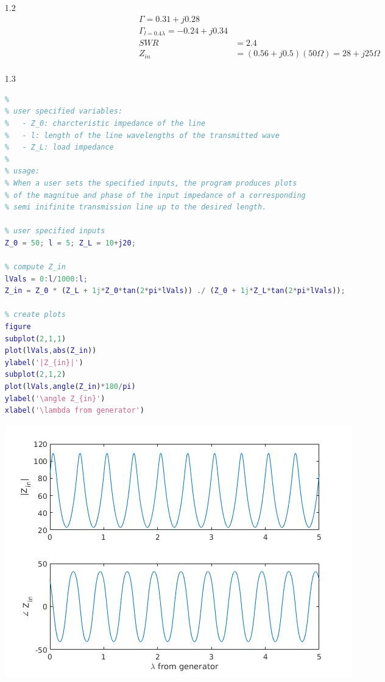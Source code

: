 \documentclass{article}
\begin{document}
\begin{enumerate}
\item[1.2]
\begin{align*}
\Gamma = 0.31 + j 0.28 \\
{\Gamma}_{l=0.4\lambda} = -0.24 + j 0.34 \\
SWR &= 2.4 \\
Z_{in} &= (0.56 + j0.5)(50\Omega) = 28 + j25 \Omega \\
\end{align*}

\item[1.3]
\ \\
\begin{lstlisting}[language=matlab]
%% ZinSITL: plot Z_in for a simi-infinite transmission line carrying a sinusoid
%
% user specified variables:
%   - Z_0: charcteristic impedance of the line
%   - l: length of the line wavelengths of the transmitted wave
%   - Z_L: load impedance
%
% usage:
% When a user sets the specified inputs, the program produces plots
% of the magnitue and phase of the input impedance of a corresponding
% semi inifinite transmission line up to the desired length.

% user specified inputs
Z_0 = 50; l = 5; Z_L = 10+j20;

% compute Z_in
lVals = 0:l/1000:l;
Z_in = Z_0 * (Z_L + 1j*Z_0*tan(2*pi*lVals)) ./ (Z_0 + 1j*Z_L*tan(2*pi*lVals));

% create plots
figure
subplot(2,1,1)
plot(lVals,abs(Z_in))
ylabel('|Z_{in}|')
subplot(2,1,2)
plot(lVals,angle(Z_in)*180/pi)
ylabel('\angle Z_{in}')
xlabel('\lambda from generator')
\end{lstlisting}
\includegraphics[width=\textwidth]{HW1-3}
\end{enumerate}
\end{document}

